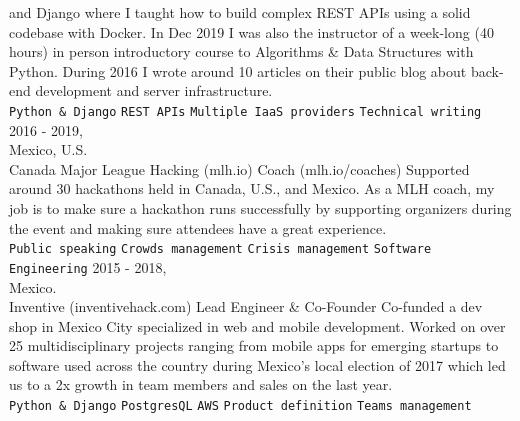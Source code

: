\documentclass[9pt]{developercv}
\begin{document}
\begin{entrylist}
{            and Django where I taught how to build complex REST APIs using a solid codebase with Docker.
            In Dec 2019 I was also the instructor of a week-long (40 hours) in person introductory
            course to Algorithms \& Data Structures with Python. During 2016 I wrote around 10
            articles on their public blog about back-end development and server infrastructure. \\
                \texttt{Python \& Django}\slashsep
                \texttt{REST APIs}\slashsep
                \texttt{Multiple IaaS providers}\slashsep
                \texttt{Technical writing}
        }
    \entry
        {2016 - 2019, \\Mexico, U.S.\\Canada}
        {Major League Hacking (mlh.io)}
        {Coach (mlh.io/coaches)}
        {
            Supported around 30 hackathons held in Canada, U.S., and Mexico. As
            a MLH coach, my job is to make sure a hackathon runs successfully by supporting
            organizers during the event and making sure attendees have a great experience.\\
                \texttt{Public speaking}\slashsep
                \texttt{Crowds management}\slashsep
                \texttt{Crisis management}\slashsep
                \texttt{Software Engineering}
        }
    \entry
        {
            2015 - 2018,\\
            Mexico.\\
        }
        {Inventive (inventivehack.com)}
        {Lead Engineer \& Co-Founder}
        {
            Co-funded a dev shop in Mexico City specialized in web and mobile development.
            Worked on over 25 multidisciplinary projects ranging from mobile apps for
            emerging startups to software used across the country during Mexico's local election
            of 2017 which led us to a 2x growth in team members and sales on the last year.\\
                \texttt{Python \& Django}\slashsep
                \texttt{PostgresQL}\slashsep
                \texttt{AWS}\slashsep
                \texttt{Product definition}\slashsep
                \texttt{Teams management}
        }
\end{entrylist}

\end{document}

